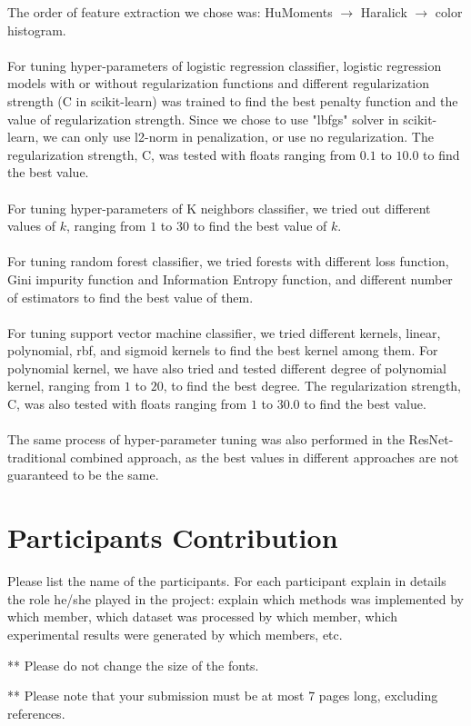 \documentclass[11.5pt]{article}
\begin{document}
    The order of feature extraction we chose was: HuMoments $\rightarrow$ Haralick $\rightarrow$ color histogram.\\ \\
    For tuning hyper-parameters of logistic regression classifier, logistic regression models with or without regularization functions and different regularization strength (C in scikit-learn) was trained to find the best penalty function and the value of regularization strength.
    Since we chose to use "lbfgs" solver in scikit-learn, we can only use l2-norm in penalization, or use no regularization.
    The regularization strength, C, was tested with floats ranging from $0.1$ to $10.0$ to find the best value.\\ \\
    For tuning hyper-parameters of K neighbors classifier, we tried out different values of $k$, ranging from $1$ to $30$ to find the best value of $k$.\\ \\
    For tuning random forest classifier, we tried forests with different loss function, Gini impurity function and Information Entropy function, and different number of estimators to find the best value of them.\\ \\
    For tuning support vector machine classifier, we tried different kernels, linear, polynomial, rbf, and sigmoid kernels to find the best kernel among them.
    For polynomial kernel, we have also tried and tested different degree of polynomial kernel, ranging from $1$ to $20$, to find the best degree.
    The regularization strength, C, was also tested with floats ranging from $1$ to $30.0$ to find the best value.\\ \\
    The same process of hyper-parameter tuning was also performed in the ResNet-traditional combined approach, as the best values in different approaches are not guaranteed to be the same.


    \section{Participants Contribution}
    Please list the name of the participants. For each participant explain in details the role he/she played in the project: explain which methods was implemented by which member, which dataset was processed by which member, which experimental results were generated by which members, etc.

    \vspace{10mm}
    ** Please do not change the size of the fonts.

    ** Please note that your submission must be at most 7 pages long, excluding references.

    \newpage
    
    {}
    

    
\end{document}
